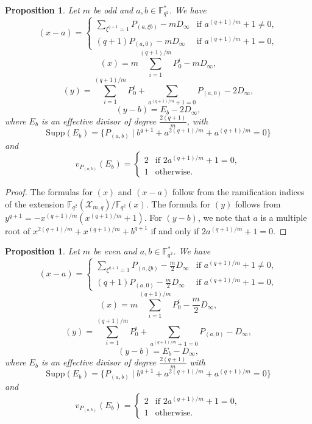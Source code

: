 \documentclass[12pt]{amsart}
\newtheorem{proposition}[theorem]{Proposition}
\theoremstyle{remark}
\theoremstyle{definition}
\begin{document}
\begin{proposition}\label{divi-xy1}
Let $m$ be odd and $a, b \in \mathbb{F}_{q^2}^*$. We have
$$(x-a) = \begin{cases}
    \displaystyle\sum_{\xi^{q+1}=1} P_{(a,\xi b)} - m D_{\infty} 
    & \text{if } a^{(q+1)/m}+1\neq 0, \\[6pt]
    (q+1)P_{(a,0)} - m D_{\infty} 
    & \text{if } a^{(q+1)/m}+1 = 0,
\end{cases}$$
$$(x) = m\sum_{i=1}^{(q+1)/m}P_0^i - m D_{\infty},$$
$$(y) = \sum_{i=1}^{(q+1)/m}P_0^i + 
\sum_{a^{(q+1)/m}+1=0}P_{(a,0)} - 2D_{\infty},$$
$$(y-b) = E_b - 2D_{\infty},$$
where $E_b$ is an effective divisor of degree $\frac{2(q+1)}{m}$, with
$$\mathrm{Supp}(E_b) = 
\{P_{(a,b)} \mid b^{q+1}+a^{2(q+1)/m}+a^{(q+1)/m}=0\}$$
and
$$v_{P_{(a,b)}}(E_b) = \begin{cases}
    2 & \text{if } 2a^{(q+1)/m}+1=0, \\
    1 & \text{otherwise.}
\end{cases}$$
\end{proposition}

\begin{proof}
The formulas for $(x)$ and $(x-a)$ follow from the ramification 
indices of the extension 
$\mathbb{F}_{q^2}(\mathcal{X}_{m,q})/\mathbb{F}_{q^2}(x)$. The formula 
for $(y)$ follows from 
$y^{q+1}=-x^{(q+1)/m}(x^{(q+1)/m}+1)$. For $(y-b)$, we note that 
$a$ is a multiple root of $x^{2(q+1)/m}+x^{(q+1)/m}+b^{q+1}$ if and 
only if $2a^{(q+1)/m}+1=0$.
\end{proof}

\begin{proposition}\label{divi-xy2}
Let $m$ be even and $a, b \in \mathbb{F}_{q^2}^*$. We have
$$(x-a) = \begin{cases}
    \displaystyle\sum_{\xi^{q+1}=1} P_{(a,\xi b)} - 
    \frac{m}{2} D_{\infty} 
    & \text{if } a^{(q+1)/m}+1\neq 0, \\[6pt]
    (q+1)P_{(a,0)} - \frac{m}{2} D_{\infty} 
    & \text{if } a^{(q+1)/m}+1 = 0,
\end{cases}$$
$$(x) = m\sum_{i=1}^{(q+1)/m}P_0^i - \frac{m}{2} D_{\infty},$$
$$(y) = \sum_{i=1}^{(q+1)/m}P_0^i + 
\sum_{a^{(q+1)/m}+1=0}P_{(a,0)} - D_{\infty},$$
$$(y-b) = E_b - D_{\infty},$$
where $E_b$ is an effective divisor of degree $\frac{2(q+1)}{m}$ with
$$\mathrm{Supp}(E_b) = 
\{P_{(a,b)} \mid b^{q+1}+a^{2(q+1)/m}+a^{(q+1)/m}=0\}$$
and
$$v_{P_{(a,b)}}(E_b) = \begin{cases}
    2 & \text{if } 2a^{(q+1)/m}+1=0, \\
    1 & \text{otherwise.}
\end{cases}$$
\end{proposition}
\end{document}
